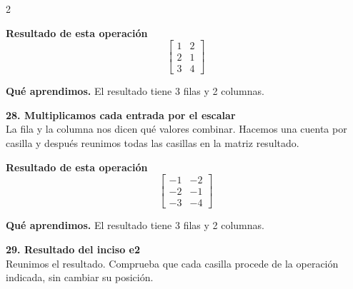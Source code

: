 \documentclass[11pt,a4paper,landscape]{article}
\begin{document}
\begin{multicols*}{2}
\begin{minipage}{\linewidth}
\par\smallskip \textbf{Resultado de esta operación}\[\begin{bmatrix}1 & 2\\2 & 1\\3 & 4\end{bmatrix}\]
\par\smallskip\textbf{Qué aprendimos.} El resultado tiene 3 filas y 2 columnas.
\end{minipage}\par\medskip
\noindent\begin{minipage}{\linewidth}\textbf{28. Multiplicamos cada entrada por el escalar}\\[2pt]La fila y la columna nos dicen qué valores combinar. Hacemos una cuenta por casilla y después reunimos todas las casillas en la matriz resultado.
\par{}\par\smallskip
\par\smallskip \textbf{Resultado de esta operación}\[\begin{bmatrix}-1 & -2\\-2 & -1\\-3 & -4\end{bmatrix}\]
\par\smallskip\textbf{Qué aprendimos.} El resultado tiene 3 filas y 2 columnas.
\end{minipage}\par\medskip
\noindent\begin{minipage}{\linewidth}\textbf{29. Resultado del inciso e2}\\[2pt]Reunimos el resultado. Comprueba que cada casilla procede de la operación indicada, sin cambiar su posición.

\end{minipage}
\end{multicols*}
\end{document}
